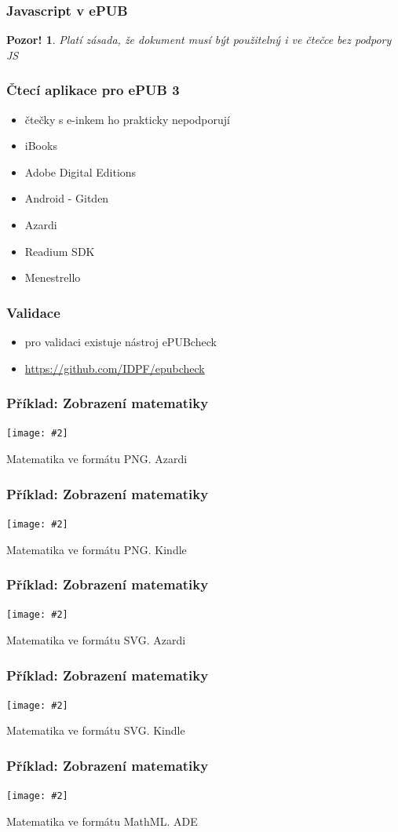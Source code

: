 \documentclass[czech]{beamer}
\newtheorem{pozor}{Pozor!}
\newcommand\myfig[3][width=.9\textwidth]{%
  \figure\texttt{[image: \#2]}%
  \caption{#3}%
\endfigure}
\begin{document}
\begin{frame}
  \frametitle{Javascript v ePUB}
\begin{pozor}
        Platí zásada, že dokument musí být použitelný i ve čtečce bez podpory JS
      \end{pozor}
\end{frame}
\begin{frame}
  \frametitle{Čtecí aplikace pro ePUB 3}
  \begin{itemize}
  \item čtečky s e-inkem ho prakticky nepodporují
  \item iBooks
  \item Adobe Digital Editions
  \item Android - Gitden
  \item Azardi
  \item Readium SDK
  \item Menestrello
\end{itemize}
\end{frame}
\begin{frame}
  \frametitle{Validace}
  \begin{itemize}
    \item pro validaci existuje nástroj ePUBcheck
    \item \url{https://github.com/IDPF/epubcheck}
  \end{itemize}
\end{frame}
\begin{frame}
  \frametitle{Příklad: Zobrazení matematiky}
  {\myfig{examples/png-epub.png}{Matematika ve formátu PNG. Azardi}}
\end{frame}
\begin{frame}
  \frametitle{Příklad: Zobrazení matematiky}
  {\myfig{examples/png-mobi.png}{Matematika ve formátu PNG. Kindle}}
\end{frame}
\begin{frame}
  \frametitle{Příklad: Zobrazení matematiky}
  \myfig{examples/svg-epub.png}{Matematika ve formátu SVG. Azardi}
\end{frame}
\begin{frame}
  \frametitle{Příklad: Zobrazení matematiky}
  \myfig[height=0.6\paperheight]{examples/svg-mobi.png}{Matematika ve formátu SVG. Kindle}
\end{frame}
\begin{frame}
  \frametitle{Příklad: Zobrazení matematiky}
  \myfig{examples/mathml-ade.png}{Matematika ve formátu MathML. ADE}
\end{frame}
\end{document}

